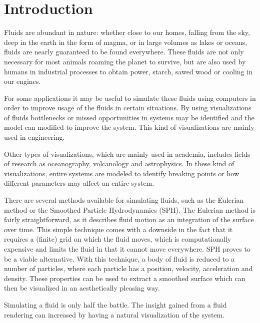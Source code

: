 \section{Introduction}
Fluids are abundant in nature: whether close to our homes, falling from the sky, deep in the earth in the form of magma, or in large volumes as lakes or oceans, fluids are nearly guaranteed to be found everywhere. 
These fluids are not only necessary for most animals roaming the planet to survive, but are also used by humans in industrial processes to obtain power, starch, sawed wood or cooling in our engines.

For some applications it may be useful to simulate these fluids using computers in order to improve usage of the fluids in certain situations.
By using visualizations of fluids bottlenecks or missed opportunities in systems may be identified and the model can modified to improve the system.
This kind of visualizations are mainly used in engineering.

Other types of visualizations, which are mainly used in academia, includes fields of research as oceanography, volcanology and astrophysics. 
In these kind of visualizations, entire systems are modeled to identify breaking points or how different parameters may affect an entire system.

There are several methods available for simulating fluids, such as the Eulerian method or the Smoothed Particle Hydrodynamics (SPH). The Eulerian method is fairly straightforward, as it describes fluid motion as an integration of the surface over time. 
This simple technique comes with a downside in the fact that it requires a (finite) grid on which the fluid moves, which is computationally expensive and limits the fluid in that it cannot move everywhere.
SPH proves to be a viable alternative. 
With this technique, a body of fluid is reduced to a number of particles, where each particle has a position, velocity, acceleration and density.
These properties can be used to extract a smoothed surface which can then be visualized in an aesthetically pleasing way. 	

Simulating a fluid is only half the battle. The insight gained from a fluid rendering can increased by having a natural visualization of the system. 
